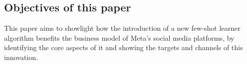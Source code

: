 \subsection{Objectives of this paper}
This paper aims to showlight how the introduction of a new few-shot
learner algorithm benefits the business model of Meta's social media
platforms, by identifying the core aspects of it and showing the
targets and channels of this innovation.
